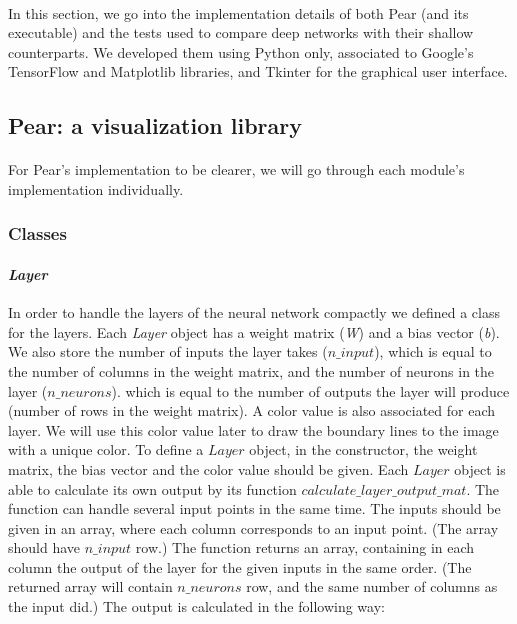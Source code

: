 \documentclass[a4paper]{article}
\begin{document}
\paragraph{}In this section, we go into the implementation details of both Pear (and its executable) and the tests used to compare deep networks with their shallow counterparts. We developed them using Python only, associated to Google's TensorFlow and Matplotlib libraries, and Tkinter \citep{Hughes:2000:PTP:350314.350415} for the graphical user interface.

\subsection{Pear: a visualization library}
\paragraph{} For Pear's implementation to be clearer, we will go through each module's implementation individually. 

\subsubsection{Classes}
\paragraph{\textit{Layer}} In order to handle the layers of the neural network compactly we defined a class for the layers.
Each \textit{Layer} object has a weight matrix (\textit{W}) and a bias vector (\textit{b}). We also store the number of inputs the layer takes ($n\_input$), which is equal to the number of columns in the weight matrix, and the number of neurons in the layer ($n\_neurons$). which is equal to the number of outputs the layer will produce (number of rows in the weight matrix). A color value is also associated for each layer. We will use this color value later to draw the boundary lines to the image with a unique color. To define a $Layer$ object, in the constructor, the weight matrix, the bias vector and the color value should be given. 
Each $Layer$ object is able to calculate its own output by its function $calculate\_layer\_output\_mat$. The function can handle several input points in the same time. The inputs should be given in an array, where each column corresponds to an input point. (The array should have $n\_input$ row.) The function returns an array, containing in each column the output of the layer for the given inputs in the same order. (The returned array will contain $n\_neurons$ row, and the same number of columns as the input did.) The output is calculated in the following way:
\end{document}
